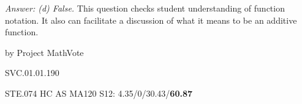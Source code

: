 {\it Answer:  (d) False.}  This question checks student understanding of function notation.  It also can facilitate a discussion of what it means to be an additive function.

\medskip
by Project MathVote

SVC.01.01.190

STE.074
HC AS MA120 S12: 4.35/0/30.43/{\bf60.87}  \\
